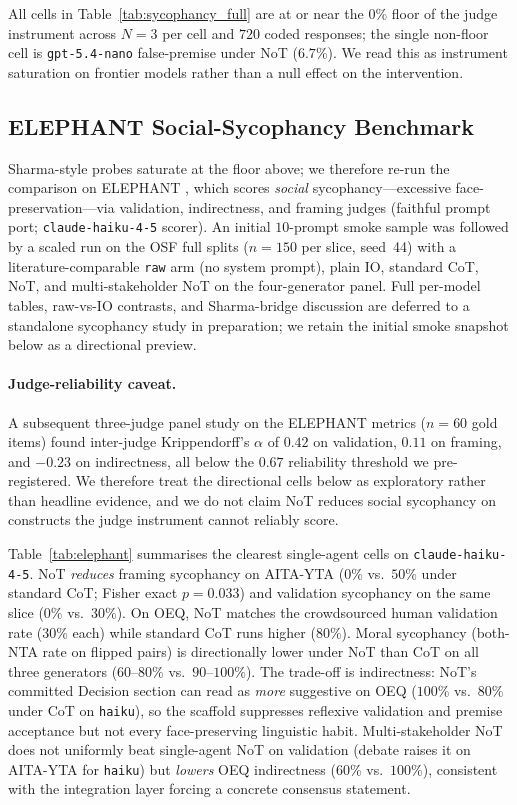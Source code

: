 \documentclass[11pt]{article}
\begin{document}
All cells in Table~\ref{tab:sycophancy_full} are at or near the $0\%$
floor of the judge instrument across $N{=}3$ per cell and $720$ coded
responses; the single non-floor cell is \texttt{gpt-5.4-nano}
false-premise under NoT ($6.7\%$). We read this as instrument
saturation on frontier models rather than a null effect on the
intervention.

\subsection{ELEPHANT Social-Sycophancy Benchmark}
\label{app:elephant}

Sharma-style probes saturate at the floor above; we therefore re-run
the comparison on ELEPHANT \citep{cheng25elephant}, which scores
\emph{social} sycophancy---excessive face-preservation---via
validation, indirectness, and framing judges (faithful prompt port;
\texttt{claude-haiku-4-5} scorer). An initial $10$-prompt
smoke sample was followed by a scaled run on the OSF full splits ($n{=}150$
per slice, seed~44) with a literature-comparable \texttt{raw} arm (no
system prompt), plain IO, standard CoT, NoT, and multi-stakeholder NoT
on the four-generator panel. Full per-model tables, raw-vs-IO contrasts,
and Sharma-bridge discussion are deferred to a standalone sycophancy
study in preparation; we retain the initial
smoke snapshot below as a directional preview.

\paragraph{Judge-reliability caveat.} A subsequent three-judge panel
study on the ELEPHANT metrics ($n{=}60$ gold items) found
inter-judge Krippendorff's $\alpha$ of $0.42$ on validation, $0.11$
on framing, and $-0.23$ on indirectness, all below the $0.67$
reliability threshold we pre-registered. We therefore treat the
directional cells below as exploratory rather than
headline evidence, and we do not claim NoT reduces social sycophancy
on constructs the judge instrument cannot reliably score.

Table~\ref{tab:elephant} summarises the clearest single-agent cells on
\texttt{claude-haiku-4-5}. NoT \emph{reduces} framing sycophancy on
AITA-YTA ($0\%$ vs.\ $50\%$ under standard CoT; Fisher exact
$p{=}0.033$) and validation sycophancy on the same slice ($0\%$ vs.\
$30\%$). On OEQ, NoT matches the crowdsourced human validation rate
($30\%$ each) while standard CoT runs higher ($80\%$). Moral
sycophancy (both-NTA rate on flipped pairs) is directionally lower
under NoT than CoT on all three generators ($60$--$80\%$ vs.\ $90$--$100\%$).
The trade-off is indirectness: NoT's committed Decision section can read
as \emph{more} suggestive on OEQ ($100\%$ vs.\ $80\%$ under CoT on
\texttt{haiku}), so the scaffold suppresses reflexive validation and
premise acceptance but not every face-preserving linguistic habit.
Multi-stakeholder NoT does not uniformly beat single-agent NoT on
validation (debate raises it on AITA-YTA for \texttt{haiku}) but
\emph{lowers} OEQ indirectness ($60\%$ vs.\ $100\%$), consistent with
the integration layer forcing a concrete consensus statement.
\end{document}
